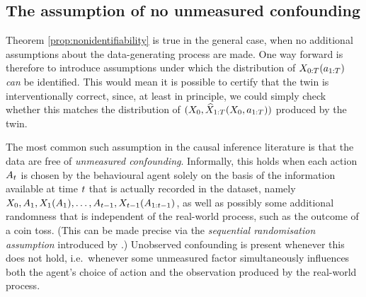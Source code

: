\subsection{The assumption of no unmeasured confounding} \label{sec:no-unmeasured-confounding-assumption}

Theorem \ref{prop:nonidentifiability} is true in the general case, when no additional assumptions about the data-generating process are made.
One way forward is therefore to introduce assumptions under which the distribution of $X_{0:T}(a_{1:T})$ \emph{can} be identified.
This would mean it is possible to certify that the twin is interventionally correct, since, at least in principle, we could simply check whether this matches the distribution of $(X_0, \widehat{X}_{1:T}(X_{0}, a_{1:T}))$ produced by the twin.

The most common such assumption in the causal inference literature is that the data are free of \emph{unmeasured confounding}.
Informally, this holds when each action $A_t$ is chosen by the behavioural agent solely on the basis of the information available at time $t$ that is actually recorded in the dataset, namely $X_{0}, A_1, X_1(A_1), \ldots, A_{t-1}, X_{t-1}(A_{1:t-1})$, as well as possibly some additional randomness that is independent of the real-world process, such as the outcome of a coin toss. (This can be made precise via the \emph{sequential randomisation assumption} introduced by \cite{robins1986new}.)
Unobserved confounding is present whenever this does not hold, i.e.\ whenever some unmeasured factor simultaneously influences both the agent's choice of action and the observation produced by the real-world process.

